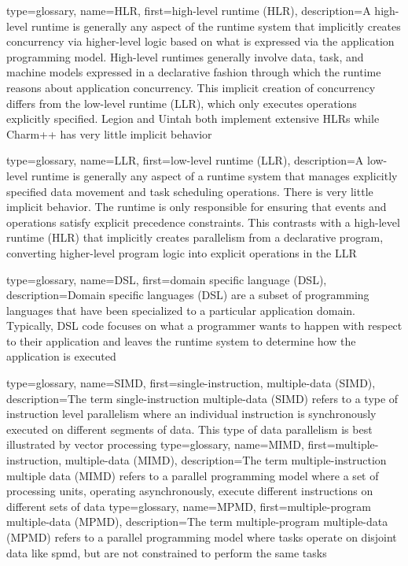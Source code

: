 {
  type=glossary,
  name={HLR},
  first={high-level runtime (HLR)},
  description={A high-level runtime is generally any aspect of the runtime system that implicitly creates concurrency via higher-level logic based on what is expressed via the application programming model.  High-level runtimes generally involve data, task, and machine models expressed in a \gls{declarative} fashion through which the runtime reasons about application concurrency. This implicit creation of concurrency differs from the low-level runtime (\gls{LLR}), which only executes operations explicitly specified.  Legion and Uintah both implement extensive HLRs while Charm++ has very little implicit behavior}
}

{
  type=glossary,
  name={LLR},
  first={low-level runtime (LLR)},
  description={A low-level runtime is generally any aspect of a \gls{runtime system} that manages explicitly specified data movement and task scheduling operations. There is very little implicit behavior. The runtime is only responsible for ensuring that events and operations satisfy explicit precedence constraints. This contrasts with a high-level runtime (\gls{HLR}) that implicitly creates parallelism from a declarative program, converting higher-level program logic into explicit operations in the LLR}
}

{
  type=glossary,
  name={DSL},
  first={domain specific language (DSL)},
  description={Domain specific languages (DSL) are a subset of
    \glspl{programming language} that have been specialized to a particular
      application domain. Typically, DSL code focuses on what a programmer
      wants to happen with respect to their application and leaves the
      \gls{runtime system} to determine how the application is executed}
}

{
  type=glossary,
  name={SIMD},
  first={single-instruction, multiple-data (SIMD)},
  description={The term single-instruction multiple-data (SIMD) refers to a type of instruction level parallelism where an individual instruction is synchronously executed on different segments of data. This type of \gls{data parallelism} is best illustrated by \gls{vector processing}}
}
{
  type=glossary,
  name={MIMD},
  first={multiple-instruction, multiple-data (MIMD)},
  description={The term multiple-instruction multiple data (MIMD) refers to a parallel \gls{programming model} where a set of processing units, operating asynchronously, execute different instructions on different sets of data}
}
{
  type=glossary,
  name={MPMD},
  first={multiple-program multiple-data (MPMD)},
  description={The term multiple-program multiple-data (MPMD) refers to a
    parallel programming model where tasks operate on disjoint data like \gls{spmd}, but are not constrained to perform the same tasks}
}

